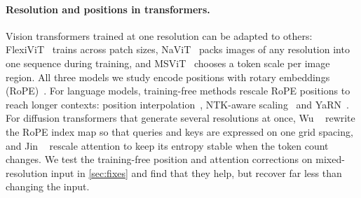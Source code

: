\paragraph{Resolution and positions in transformers.}
Vision transformers trained at one resolution can be adapted to others: FlexiViT~\cite{beyer2023flexivit} trains across patch sizes, NaViT~\cite{dehghani2023navit} packs images of any resolution into one sequence during training, and MSViT~\cite{havtorn2023msvit} chooses a token scale per image region. All three models we study encode positions with rotary embeddings (RoPE)~\cite{su2024roformer}. For language models, training-free methods rescale RoPE positions to reach longer contexts: position interpolation~\cite{chen2023pi}, NTK-aware scaling~\cite{bloc97ntk} and YaRN~\cite{peng2023yarn}. For diffusion transformers that generate several resolutions at once, Wu \etal~\cite{crpa2025} rewrite the RoPE index map so that queries and keys are expressed on one grid spacing, and Jin \etal~\cite{jin2023training} rescale attention to keep its entropy stable when the token count changes. We test the training-free position and attention corrections on mixed-resolution input in \cref{sec:fixes} and find that they help, but recover far less than changing the input.
